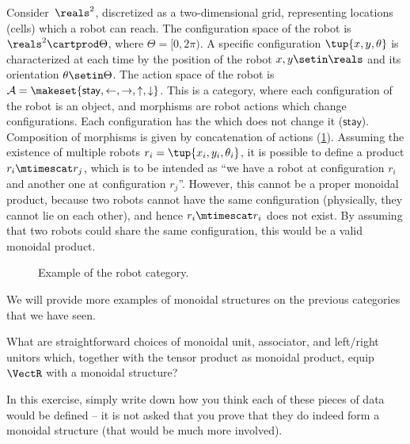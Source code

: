 \begin{example}
    \label{ex:robot}
    Consider~$\reals^2$, discretized as a two-dim\-ensional grid, representing locations (cells) which a robot can reach.
    The configuration space of the robot is $\reals^2\cartprod \Theta$, where $\Theta=[0,2\pi)$.
    A specific configuration $\tup{x,y,\theta}$ is characterized at each time by the position of the robot $x,y\setin \reals$ and its orientation $\theta \setin \Theta$.
    The action space of the robot is $\mathcal{A}=\makeset{\mathsf{stay},\leftarrow, \rightarrow, \uparrow, \downarrow}$.
    This is a category, where each configuration of the robot is an object, and morphisms are robot actions which change configurations.
    Each configuration has the  which does not change it ($\mathsf{stay}$).
    Composition of morphisms is given by concatenation of actions (\cref{fig:robotcategory}).
    Assuming the existence of multiple robots $r_i=\tup{x_i,y_i,\theta_i}$, it is possible to define a product $r_i\mtimescat r_j$, which is to be intended as ``we have a robot at configuration $r_i$ and another one at configuration $r_j$''.
    However, this cannot be a proper monoidal product, because two robots cannot have the same configuration (physically, they cannot lie on each other), and hence $r_i\mtimescat r_i$ does not exist.
    By assuming that two robots could share the same configuration, this would be a valid monoidal product.
    \begin{figure}[tbh]
        \centering
        \caption{Example of the robot category. }
        \label{fig:robotcategory}
    \end{figure}
\end{example}

\begin{publictodo}
    We will provide more examples of monoidal structures on the previous categories that we have seen.
\end{publictodo}

\begin{gradedexercise}
    \label{ex:VectTensorMonStructure}
    What are straightforward choices of monoidal unit, associator, and left/right unitors which, together with the tensor product as monoidal product, equip $\VectR$ with a monoidal structure?

    In this exercise, simply write down how you think each of these pieces of data would be defined -- it is not asked that you prove that they do indeed form a monoidal structure (that would be much more involved).
\end{gradedexercise}

